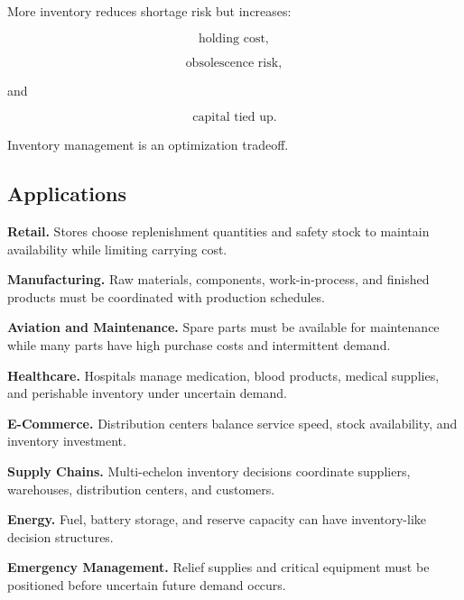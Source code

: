 More inventory reduces shortage risk but increases:

\[
\boxed{
\text{holding cost},
}
\]

\[
\boxed{
\text{obsolescence risk},
}
\]

and

\[
\boxed{
\text{capital tied up}.
}
\]

Inventory management is an optimization tradeoff.

\subsection{Applications}
\label{subsec:inventory-applications}

\begin{applicationbox}

\textbf{Retail.}
Stores choose replenishment quantities and safety stock to maintain
availability while limiting carrying cost.

\medskip

\textbf{Manufacturing.}
Raw materials, components, work-in-process, and finished products must be
coordinated with production schedules.

\medskip

\textbf{Aviation and Maintenance.}
Spare parts must be available for maintenance while many parts have high
purchase costs and intermittent demand.

\medskip

\textbf{Healthcare.}
Hospitals manage medication, blood products, medical supplies, and
perishable inventory under uncertain demand.

\medskip

\textbf{E-Commerce.}
Distribution centers balance service speed, stock availability, and
inventory investment.

\medskip

\textbf{Supply Chains.}
Multi-echelon inventory decisions coordinate suppliers, warehouses,
distribution centers, and customers.

\medskip

\textbf{Energy.}
Fuel, battery storage, and reserve capacity can have inventory-like
decision structures.

\medskip

\textbf{Emergency Management.}
Relief supplies and critical equipment must be positioned before uncertain
future demand occurs.

\end{applicationbox}

